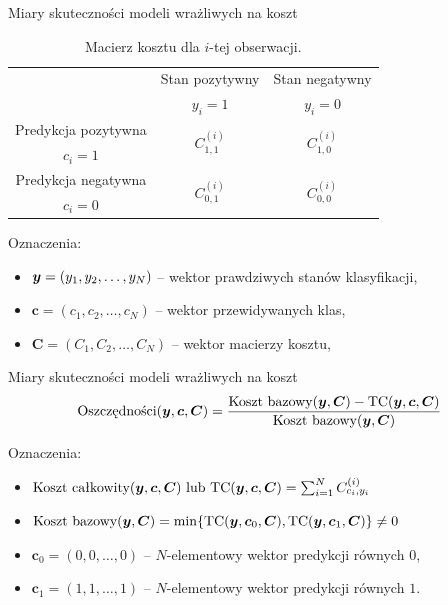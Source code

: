 \documentclass{beamer}
\begin{document}
\begin{frame}{Miary skuteczności modeli wrażliwych na koszt}
	\begin{table}
		\begin{center}
			\begin{tabular}{c|c|c}
				\multirow{2}{4em}{} & Stan pozytywny & Stan negatywny \\
				& $y_i = 1$            & $y_i = 0$ \\
				\hline
				Predykcja pozytywna & \multirow{2}{4em}{\centering $C^{(i)}_{1,1}$} & \multirow{2}{4em}{\centering $C^{(i)}_{1,0}$} \\
				$c_i = 1$         &                    &                    \\
				\hline
				Predykcja negatywna & \multirow{2}{4em}{\centering $C^{(i)}_{0,1}$} & \multirow{2}{4em}{\centering $C^{(i)}_{0,0}$} \\
				$c_i = 0$         &                    &                    \\
			\end{tabular}
		\end{center}
		\caption{Macierz kosztu dla $i$-tej obserwacji.}
		\label{tab:macierz-kosztu}
	\end{table}

	Oznaczenia:
	\begin{itemize}
		\item $\boldsymbol{y} = (y_1, y_2, \dots, y_N)$ -- wektor prawdziwych stanów klasyfikacji,
		\item $\boldsymbol{c} = (c_1, c_2, \dots, c_N) $ -- wektor przewidywanych klas,
		\item $ \boldsymbol{C} = (C_1, C_2, \dots, C_N) $ -- wektor macierzy kosztu,
	\end{itemize}
\end{frame}

\begin{frame}{Miary skuteczności modeli wrażliwych na koszt}
	$$ \text{Oszczędności}(\boldsymbol{y}, \boldsymbol{c}, \boldsymbol{C}) = \frac{\text{Koszt bazowy}(\boldsymbol{y}, \boldsymbol{C}) - \text{TC}(\boldsymbol{y}, \boldsymbol{c}, \boldsymbol{C})}{\text{Koszt bazowy}(\boldsymbol{y}, \boldsymbol{C})} $$
	
	\vspace{0.7cm}
	Oznaczenia:
	\begin{itemize}
		\item $ \text{Koszt całkowity}(\boldsymbol{y}, \boldsymbol{c}, \boldsymbol{C}) \text{ lub } \text{TC}(\boldsymbol{y}, \boldsymbol{c}, \boldsymbol{C})= \sum_{i=1}^N C^{(i)}_{c_i,y_i} $
		\item $ \text{Koszt bazowy}(\boldsymbol{y}, \boldsymbol{C}) = \min\{\text{TC}(\boldsymbol{y}, \boldsymbol{c}_0, \boldsymbol{C}), \text{TC}(\boldsymbol{y}, \boldsymbol{c}_1, \boldsymbol{C})\} \neq 0$
		\item $\boldsymbol{c}_0 = (0, 0, \dots, 0)$ -- $N$-elementowy wektor predykcji równych $0$,
		\item $\boldsymbol{c}_1 = (1, 1, \dots, 1)$ -- $N$-elementowy wektor predykcji równych $1$.

	\end{itemize}
\end{frame}
\end{document}

